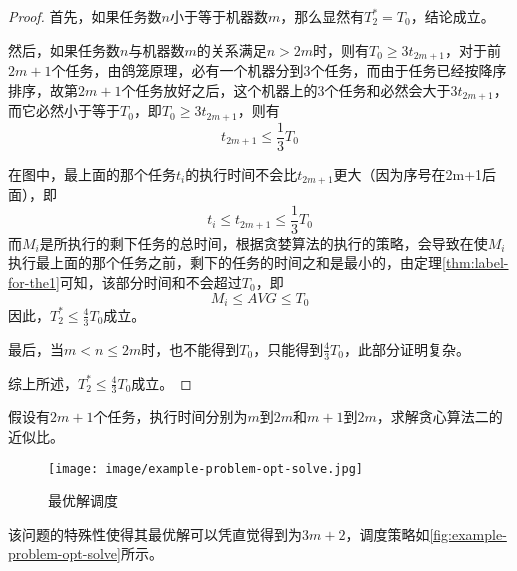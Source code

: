 \begin{proof}
	首先，如果任务数$n$小于等于机器数$m$，那么显然有$T_2^*=T_0$，结论成立。

	然后，如果任务数$n$与机器数$m$的关系满足$n>2m$时，则有$T_0 \geq 3t_{2m+1}$，对于前$2m+1$个任务，由鸽笼原理，必有一个机器分到3个任务，而由于任务已经按降序排序，故第$2m+1$个任务放好之后，这个机器上的3个任务和必然会大于$3t_{2m+1}$，而它必然小于等于$T_0$，即$T_0 \geq 3t_{2m+1}$，则有
	\begin{equation*}
		t_{2m+1} \leq \frac{1}{3}T_0
	\end{equation*}
	
	在图中，最上面的那个任务$t_i$的执行时间不会比$t_{2m+1}$更大（因为序号在2m+1后面），即
	\begin{equation*}
		t_i \leq t_{2m+1} \leq \frac{1}{3}T_0
	\end{equation*}
	而$M_i$是所执行的剩下任务的总时间，根据贪婪算法的执行的策略，会导致在使$M_i$执行最上面的那个任务之前，剩下的任务的时间之和是最小的，由定理\ref{thm:label-for-the1}可知，该部分时间和不会超过$T_0$，即
	\begin{equation*}
		M_i \leq AVG \leq T_0
	\end{equation*}
	因此，$T_2^*\leq \frac{4}{3}T_0$成立。

	最后，当$m<n \leq 2m$时，也不能得到$T_0$，只能得到$\frac{4}{3}T_0$，此部分证明复杂。

	综上所述，$T_2^*\leq \frac{4}{3}T_0$成立。
\end{proof}

\begin{example}
	假设有$2m+1$个任务，执行时间分别为$m$到$2m$和$m+1$到$2m$，求解贪心算法二的近似比。
\end{example}

\begin{figure}[hbt]
	\centering
	\texttt{[image: image/example-problem-opt-solve.jpg]}
	\caption{最优解调度}\label{fig:example-problem-opt-solve}
\end{figure}
该问题的特殊性使得其最优解可以凭直觉得到为$3m+2$，调度策略如\autoref{fig:example-problem-opt-solve}所示。

